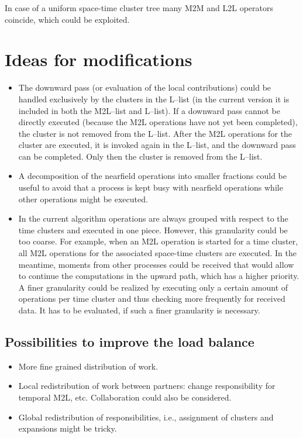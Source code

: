 \documentclass[a4paper,11pt]{article}
\theoremstyle{plain}
\theoremstyle{definition}
\theoremstyle{remark}
\begin{document}
In case of a uniform space-time cluster tree many M2M and L2L operators coincide, which could be exploited.

\section{Ideas for modifications}
\begin{itemize}
  \item The downward pass (or evaluation of the local contributions) could be handled exclusively by the clusters in the L--list (in the current version it is included in both the M2L--list and L--list). If a downward pass cannot be directly executed (because the M2L operations have not yet been completed), the cluster is not removed from the L--list. After the M2L operations for the cluster are executed, it is invoked again in the L--list, and the downward pass can be completed. Only then the cluster is removed from the L--list.
  \item A decomposition of the nearfield operations into smaller fractions could be useful to avoid that a process is kept busy with nearfield operations while other operations might be executed.
  \item In the current algorithm operations are always grouped with respect to the time clusters and executed in one piece. However, this granularity could be too coarse. For example, when an M2L operation is started for a time cluster, all M2L operations for the associated space-time clusters are executed. In the meantime, moments from other processes could be received that would allow to continue the computations in the upward path, which has a higher priority. A finer granularity could be realized by executing only a certain amount of operations per time cluster and thus checking more frequently for received data. It has to be evaluated, if such a finer granularity is necessary.
\end{itemize}

\subsection{Possibilities to improve the load balance}
\begin{itemize}
  \item More fine grained distribution of work.
  \item Local redistribution of work between partners: change responsibility for temporal M2L, etc. Collaboration could also be considered.
  \item Global redistribution of responsibilities, i.e., assignment of clusters and expansions might be tricky.
\end{itemize}
\end{document}
